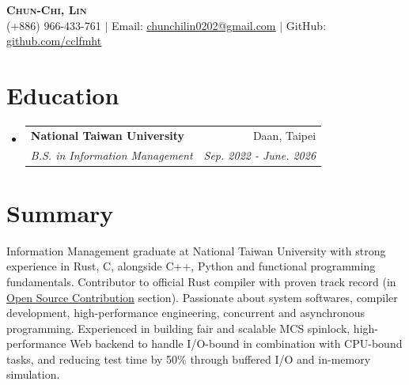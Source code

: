 \documentclass[letterpaper,11pt]{article}
\makeatletter
\newcommand{\resumeSubheading}[4]{
  \vspace{-2pt}\item
    \begin{tabular*}{0.97\textwidth}[t]{l@{\extracolsep{\fill}}r}
      \textbf{#1} & #2 \\
      \textit{\small#3} & \textit{\small #4} \\
    \end{tabular*}\vspace{-7pt}
}
\newcommand{\resumeSubHeadingListStart}{\begin{itemize}[leftmargin=0.15in, label={}]}
\newcommand{\resumeSubHeadingListEnd}{\end{itemize}}
\makeatother
\begin{document}

\begin{center}
	\textbf{\Huge \scshape Chun-Chi, Lin} \\ \vspace{1pt}
	\small (+886) 966-433-761 $|$ Email: \href{mailto:chunchilin0202@gmail.com}{\underline{chunchilin0202@gmail.com}} $|$
	GitHub: \href{https://github.com/cclfmht}{\underline{github.com/cclfmht}}
\end{center}


\section{Education}
\resumeSubHeadingListStart
\resumeSubheading
{National Taiwan University}{Daan, Taipei}
{B.S. in Information Management}{Sep. 2022 - June. 2026}
\resumeSubHeadingListEnd

\section{Summary}
Information Management graduate at National Taiwan University with strong experience in Rust, C, alongside
C++, Python and functional programming fundamentals. Contributor to official Rust compiler
with proven track record (in \hyperref[sec:osc]{Open Source Contribution} section). Passionate about system
softwares, compiler development, high-performance engineering, concurrent and asynchronous programming.
Experienced in building fair and scalable MCS spinlock, high-performance Web backend to handle I/O-bound in
combination with CPU-bound tasks, and reducing test time by 50\% through buffered I/O and in-memory simulation.

\end{document}
